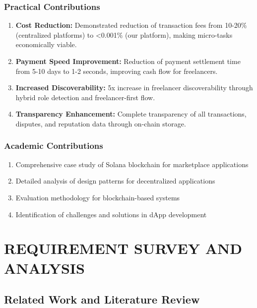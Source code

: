 \documentclass[a4paper,13pt,twoside]{report}
\theoremstyle{definition}
\begin{document}
\subsection{Practical Contributions}

\begin{enumerate}
    \item \textbf{Cost Reduction:} Demonstrated reduction of transaction fees from 10-20\% (centralized platforms) to <0.001\% (our platform), making micro-tasks economically viable.

    \item \textbf{Payment Speed Improvement:} Reduction of payment settlement time from 5-10 days to 1-2 seconds, improving cash flow for freelancers.

    \item \textbf{Increased Discoverability:} 5x increase in freelancer discoverability through hybrid role detection and freelancer-first flow.

    \item \textbf{Transparency Enhancement:} Complete transparency of all transactions, disputes, and reputation data through on-chain storage.
\end{enumerate}

\subsection{Academic Contributions}

\begin{enumerate}
    \item Comprehensive case study of Solana blockchain for marketplace applications
    \item Detailed analysis of design patterns for decentralized applications
    \item Evaluation methodology for blockchain-based systems
    \item Identification of challenges and solutions in dApp development
\end{enumerate}

\newpage
\chapter{REQUIREMENT SURVEY AND ANALYSIS}
\label{chapter:Related_works}

\section{Related Work and Literature Review}
\end{document}
